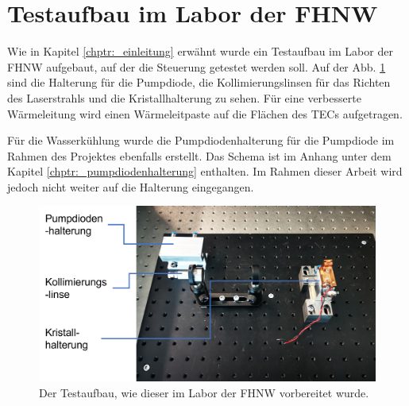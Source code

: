 \section{Testaufbau im Labor der FHNW}
Wie in Kapitel \ref{chptr:_einleitung} erwähnt wurde ein Testaufbau im Labor der FHNW aufgebaut, auf der die Steuerung getestet werden soll. Auf der Abb. \ref{fig:testaufbau} sind die Halterung für die Pumpdiode, die Kollimierungslinsen für das Richten des Laserstrahls und die Kristallhalterung zu sehen. Für eine verbesserte Wärmeleitung wird einen Wärmeleitpaste auf die Flächen des TECs aufgetragen.

Für die Wasserkühlung wurde die Pumpdiodenhalterung für die Pumpdiode im Rahmen des Projektes ebenfalls erstellt. Das Schema ist im Anhang unter dem Kapitel \ref{chptr:_pumpdiodenhalterung} enthalten. Im Rahmen dieser Arbeit wird jedoch nicht weiter auf die Halterung eingegangen.

\begin{figure}[H]
    \centering
    \includegraphics[scale=0.6]{98_images/testaufbau.png}
    \caption{Der Testaufbau, wie dieser im Labor der FHNW vorbereitet wurde.}
    \label{fig:testaufbau}
\end{figure}
